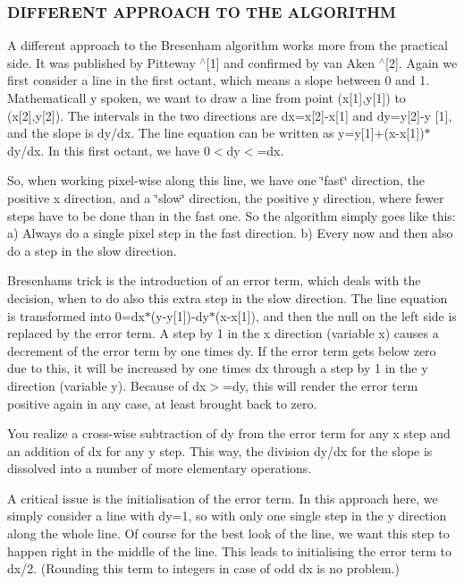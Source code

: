 \subsubsection*{D\+I\+F\+F\+E\+R\+E\+NT A\+P\+P\+R\+O\+A\+CH TO T\+HE A\+L\+G\+O\+R\+I\+T\+HM}

A different approach to the Bresenham algorithm works more from the practical side. It was published by Pitteway $^\wedge$\mbox{[}1\mbox{]} and confirmed by van Aken $^\wedge$\mbox{[}2\mbox{]}. Again we first consider a line in the first octant, which means a slope between 0 and 1. Mathematicall y spoken, we want to draw a line from point (x\mbox{[}1\mbox{]},y\mbox{[}1\mbox{]}) to (x\mbox{[}2\mbox{]},y\mbox{[}2\mbox{]}). The intervals in the two directions are dx=x\mbox{[}2\mbox{]}-\/x\mbox{[}1\mbox{]} and dy=y\mbox{[}2\mbox{]}-\/y \mbox{[}1\mbox{]}, and the slope is dy/dx. The line equation can be written as y=y\mbox{[}1\mbox{]}+(x-\/x\mbox{[}1\mbox{]})$\ast$dy/dx. In this first octant, we have 0$<$dy$<$=dx.

So, when working pixel-\/wise along this line, we have one \char`\"{}fast\char`\"{} direction, the positive x direction, and a \char`\"{}slow\char`\"{} direction, the positive y direction, where fewer steps have to be done than in the fast one. So the algorithm simply goes like this\+: a) Always do a single pixel step in the fast direction. b) Every now and then also do a step in the slow direction.

Bresenham\textquotesingle{}s trick is the introduction of an error term, which deals with the decision, when to do also this extra step in the slow direction. The line equation is transformed into 0=dx$\ast$(y-\/y\mbox{[}1\mbox{]})-\/dy$\ast$(x-\/x\mbox{[}1\mbox{]}), and then the null on the left side is replaced by the error term. A step by 1 in the x direction (variable x) causes a decrement of the error term by one times dy. If the error term gets below zero due to this, it will be increased by one times dx through a step by 1 in the y direction (variable y). Because of dx$>$=dy, this will render the error term positive again in any case, at least brought back to zero.

You realize a cross-\/wise subtraction of dy from the error term for any x step and an addition of dx for any y step. This way, the division dy/dx for the slope is dissolved into a number of more elementary operations.

A critical issue is the initialisation of the error term. In this approach here, we simply consider a line with dy=1, so with only one single step in the y direction along the whole line. Of course for the best look of the line, we want this step to happen right in the middle of the line. This leads to initialising the error term to dx/2. (Rounding this term to integers in case of odd dx is no problem.)


